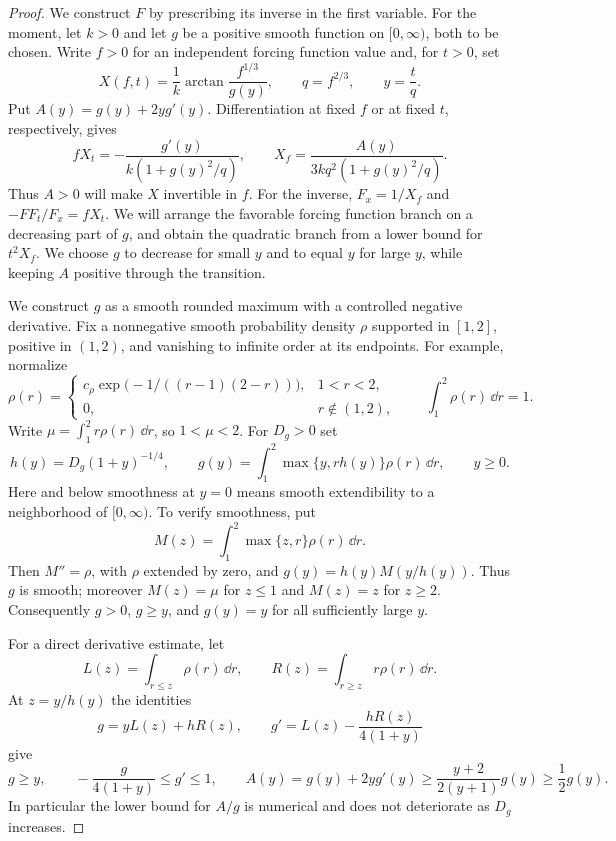 \begin{proof}
We construct $F$ by prescribing its inverse in the first variable. For
the moment, let $k>0$ and let $g$ be a positive smooth function on
$[0,\infty)$, both to be chosen. Write $f>0$ for an independent forcing function
value and, for $t>0$, set
\begin{equation}\label{forcing:inverse}
 X(f,t)=\frac1k\arctan\frac{f^{1/3}}{g(y)},\qquad
 q=f^{2/3},\qquad y=\frac tq.
\end{equation}
Put $A(y)=g(y)+2yg'(y)$. Differentiation at fixed $f$ or at fixed $t$,
respectively, gives
\begin{equation}\label{forcing:inverse-derivatives}
 fX_t=-\frac{g'(y)}{k(1+g(y)^2/q)},\qquad
 X_f=\frac{A(y)}{3kq^2(1+g(y)^2/q)}.
\end{equation}
Thus $A>0$ will make $X$ invertible in $f$. For the inverse,
$F_x=1/X_f$ and $-FF_t/F_x=fX_t$. We will arrange the favorable
forcing function branch on a decreasing part of $g$, and obtain the quadratic
branch from a lower bound for $t^2X_f$. We choose $g$ to decrease for
small $y$ and to equal $y$ for large $y$, while keeping $A$ positive
through the transition.

We construct $g$ as a smooth rounded maximum with a controlled negative
derivative.  Fix a nonnegative smooth probability density $\rho$ supported
in $[1,2]$, positive in $(1,2)$, and vanishing to infinite order at its
endpoints.  For example, normalize
\[
 \rho(r)=
 \begin{cases}
 c_\rho\exp\bigl(-1/((r-1)(2-r))\bigr),&1<r<2,\\
 0,&r\notin(1,2),
 \end{cases}
 \qquad \int_1^2\rho(r)\,\dd r=1.
\]
Write $\mu=\int_1^2r\rho(r)\,\dd r$, so $1<\mu<2$.  For $D_g>0$ set
\begin{equation}\label{forcing:rounded-max}
 h(y)=D_g(1+y)^{-1/4},\qquad
 g(y)=\int_1^2\max\{y,rh(y)\}\rho(r)\,\dd r,
 \qquad y\ge0.
\end{equation}
Here and below smoothness at $y=0$ means smooth extendibility to a
neighborhood of $[0,\infty)$.  To verify smoothness, put
\[
 M(z)=\int_1^2\max\{z,r\}\rho(r)\,\dd r.
\]
Then $M''=\rho$, with $\rho$ extended by zero, and
$g(y)=h(y)M(y/h(y))$.  Thus $g$ is smooth; moreover $M(z)=\mu$ for
$z\le1$ and $M(z)=z$ for $z\ge2$.  Consequently $g>0$, $g\ge y$, and
$g(y)=y$ for all sufficiently large $y$.

For a direct derivative estimate, let
\[
 L(z)=\int_{r\le z}\rho(r)\,\dd r,
 \qquad R(z)=\int_{r\ge z}r\rho(r)\,\dd r.
\]
At $z=y/h(y)$ the identities
\[
 g=yL(z)+hR(z),\qquad
 g'=L(z)-\frac{hR(z)}{4(1+y)}
\]
give
\begin{equation}\label{forcing:g-bounds}
 g\ge y,\qquad
 -\frac{g}{4(1+y)}\le g'\le1,\qquad
 A(y)=g(y)+2yg'(y)\ge\frac{y+2}{2(y+1)}g(y)\ge\frac12g(y).
\end{equation}
In particular the lower bound for $A/g$ is numerical and does not
deteriorate as $D_g$ increases.


\end{proof}
